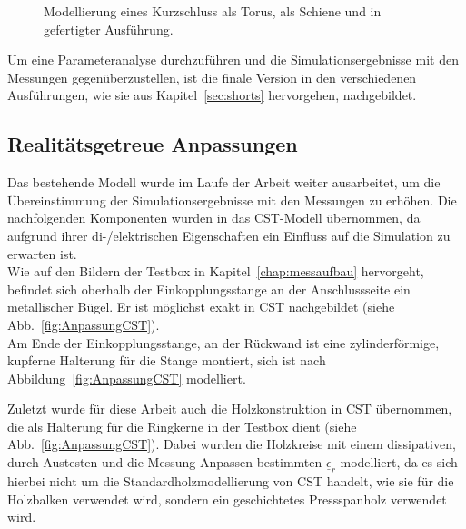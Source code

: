             \begin{figure}[htb]
                \centering
                \hspace{0.01\textwidth}
                \hspace{0.01\textwidth}
                \caption{Modellierung eines Kurzschluss \protect{} als Torus, \protect{} als Schiene und \protect{} in gefertigter Ausführung.}
                \label{fig:KSCST}
            \end{figure}
        
        Um eine Parameteranalyse durchzuführen und die Simulationsergebnisse mit den Messungen gegenüberzustellen, ist die finale Version in den verschiedenen Ausführungen, wie sie aus Kapitel~\ref{sec:shorts} hervorgehen, nachgebildet.
        
        \subsection{Realitätsgetreue Anpassungen}
        Das bestehende Modell wurde im Laufe der Arbeit weiter ausarbeitet, um die Übereinstimmung der Simulationsergebnisse mit den Messungen zu erhöhen. Die nachfolgenden Komponenten wurden in das CST-Modell übernommen, da aufgrund ihrer di-/elektrischen Eigenschaften ein Einfluss auf die Simulation zu erwarten ist.\\
        Wie auf den Bildern der Testbox in Kapitel~\ref{chap:messaufbau} hervorgeht, befindet sich oberhalb der Einkopplungsstange an der Anschlussseite ein metallischer Bügel. Er ist möglichst exakt in CST nachgebildet (siehe Abb.~\ref{fig:AnpassungCST}).\\
        Am Ende der Einkopplungsstange, an der Rückwand ist eine zylinderförmige, kupferne Halterung für die Stange montiert, sich ist nach Abbildung~\ref{fig:AnpassungCST} modelliert.
        \par
        Zuletzt wurde für diese Arbeit auch die Holzkonstruktion in CST übernommen, die als Halterung für die Ringkerne in der Testbox dient (siehe Abb.~\ref{fig:AnpassungCST}). Dabei wurden die Holzkreise mit einem dissipativen, durch Austesten und die Messung Anpassen bestimmten $\underline{\epsilon}_r$ modelliert, da es sich hierbei nicht um die Standardholzmodellierung von CST handelt, wie sie für die Holzbalken verwendet wird, sondern ein geschichtetes Pressspanholz verwendet wird.
        
